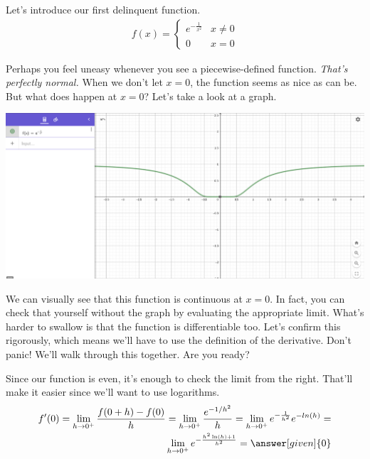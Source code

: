 \documentclass{ximera}
\begin{document}
\begin{exercise}
	
	Let's introduce our first delinquent function.
	\begin{align*}
		f(x)= 
		\begin{cases}
		e^{-\frac{1}{x^2}}  &x \neq 0 \\
		0 &x=0
		\end{cases}
	\end{align*}
	
	Perhaps you feel uneasy whenever you see a piecewise-defined function. \emph{That's perfectly normal.} When we don't let $x=0$, the function seems as nice as can be. But what does happen at $x=0$? Let's take a look at a graph.
	
	\begin{image}
		\includegraphics{graph.png}
	\end{image}
	
	We can visually see that this function is continuous at $x=0$. In fact, you can check that yourself without the graph by evaluating the appropriate limit. What's harder to swallow is that the function is differentiable too. Let's confirm this rigorously, which means we'll have to use the definition of the derivative. Don't panic! We'll walk through this together. Are you ready?
	\begin{multipleChoice}
	\end{multipleChoice}
	
	\begin{exercise}
		
		Since our function is even, it's enough to check the limit from the right. That'll make it easier since we'll want to use logarithms.
		\begin{align*}
			f'(0)= \lim_{h \to 0^+} \frac{f(0+h)-f(0)}{h} = \lim_{h \to 0^+} \frac{e^{-1/h^2}}{h} = \lim_{h \to 0^+} e^{-\frac{1}{h^2}}e^{-ln(h)} = \\
			\lim_{h \to 0^+} e^{-\frac{h^2\ln(h)+1}{h^2}} = \answer[given]{0}
		\end{align*}
		

\end{exercise}
\end{exercise}
\end{document}

